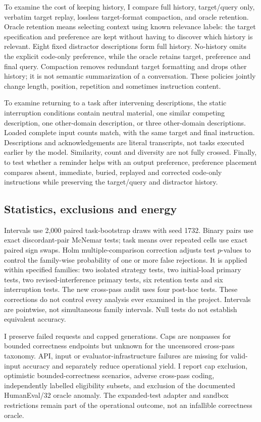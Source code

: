 \documentclass[10pt,a4paper,twocolumn]{article}
\begin{document}
To examine the cost of keeping history, I compare full history, target/query
only, verbatim target replay,
lossless target-format compaction, and oracle retention. Oracle retention means
selecting context using known relevance labels: the target specification and
preference are kept without having to discover which history is relevant. Eight fixed distractor
descriptions form full history. No-history omits the explicit code-only
preference, while the oracle retains target, preference and final query.
Compaction removes redundant target formatting and drops other history; it is
not semantic summarization of a conversation. These policies jointly change
length, position, repetition and sometimes instruction content.

To examine returning to a task after intervening descriptions, the static
interruption conditions contain neutral material, one similar competing
description, one other-domain description, or three other-domain descriptions.
Loaded complete input counts match, with the same target and final instruction.
Descriptions and acknowledgements are literal transcripts, not tasks executed
earlier by the model. Similarity, count and diversity are not fully crossed.
Finally, to test whether a reminder helps with an output preference, preference
placement compares absent, immediate, buried, replayed and corrected
code-only instructions while preserving the target/query and distractor history.

\subsection{Statistics, exclusions and energy}
Intervals use 2,000 paired task-bootstrap draws with seed 1732. Binary pairs use
exact discordant-pair McNemar tests; task means over repeated cells use exact
paired sign swaps. Holm multiple-comparison correction adjusts test $p$-values to control the
family-wise probability of one or more false rejections. It is applied within
specified families: two isolated
strategy tests, two initial-load primary tests, two revised-interference primary
tests, six retention tests and six interruption tests. The new cross-pass audit
uses four post-hoc tests. These corrections do not control every analysis ever
examined in the project. Intervals are pointwise, not simultaneous family
intervals. Null tests do not establish equivalent accuracy.

I preserve failed requests and capped generations. Caps are nonpasses
for bounded correctness endpoints but unknown for the uncensored cross-pass
taxonomy. API, input or evaluator-infrastructure failures are missing for
valid-input accuracy and separately reduce operational yield. I report cap
exclusion, optimistic bounded-correctness scenarios, adverse cross-pass coding,
independently labelled eligibility subsets, and exclusion of the documented
HumanEval/32 oracle anomaly. The expanded-test adapter and sandbox restrictions
remain part of the operational outcome, not an infallible correctness oracle.
\end{document}
